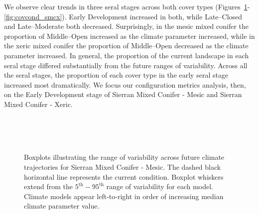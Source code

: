 We observe clear trends in three seral stages across both cover types (Figures~\ref{fig:covcond_smcm}-\ref{fig:covcond_smcx}). Early Development increased in both, while Late--Closed and Late--Moderate both decreased. Surprisingly, in the mesic mixed conifer the proportion of Middle--Open increased as the climate parameter increased, while in the xeric mixed conifer the proportion of Middle--Open decreased as the climate parameter increased. In general, the proportion of the current landscape in each seral stage differed substantially from the future ranges of variability. Across all the seral stages, the proportion of each cover type in the early seral stage increased most dramatically. We focus our configuration metrics analysis, then, on the Early Development stage of Sierran Mixed Conifer - Mesic and Sierran Mixed Conifer - Xeric.




\begin{figure}[htbp]
 \captionsetup[subfigure]{labelformat=empty}
  \centering
   \\
   \\
     \\
  \caption{Boxplots illustrating the range of variability across future climate trajectories for Sierran Mixed Conifer - Mesic. The dashed black horizontal line represents the current condition. Boxplot whiskers extend from the $5^{\text{th}} - 95^{\text{th}}$ range of variability for each model. Climate models appear left-to-right in order of increasing median climate parameter value.}
  \label{fig:covcond_smcm}
\end{figure} %

